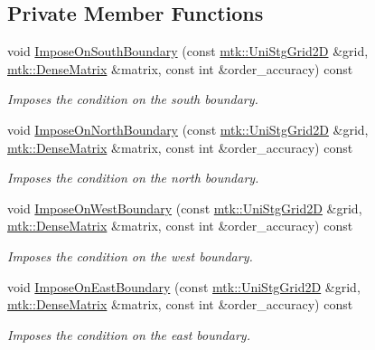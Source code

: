 \subsection*{Private Member Functions}
\begin{DoxyCompactItemize}
\item 
void \hyperlink{classmtk_1_1BCDescriptor2D_acba15639218e80fd93aff482b185201e}{Impose\+On\+South\+Boundary} (const \hyperlink{classmtk_1_1UniStgGrid2D}{mtk\+::\+Uni\+Stg\+Grid2\+D} \&grid, \hyperlink{classmtk_1_1DenseMatrix}{mtk\+::\+Dense\+Matrix} \&matrix, const int \&order\+\_\+accuracy) const 
\begin{DoxyCompactList}\small\item\em Imposes the condition on the south boundary. \end{DoxyCompactList}\item 
void \hyperlink{classmtk_1_1BCDescriptor2D_a6062894dbe7c6f42a3bbcc54f2f8973d}{Impose\+On\+North\+Boundary} (const \hyperlink{classmtk_1_1UniStgGrid2D}{mtk\+::\+Uni\+Stg\+Grid2\+D} \&grid, \hyperlink{classmtk_1_1DenseMatrix}{mtk\+::\+Dense\+Matrix} \&matrix, const int \&order\+\_\+accuracy) const 
\begin{DoxyCompactList}\small\item\em Imposes the condition on the north boundary. \end{DoxyCompactList}\item 
void \hyperlink{classmtk_1_1BCDescriptor2D_a0e7bc4d22fa8c9b9a29dd71669b35744}{Impose\+On\+West\+Boundary} (const \hyperlink{classmtk_1_1UniStgGrid2D}{mtk\+::\+Uni\+Stg\+Grid2\+D} \&grid, \hyperlink{classmtk_1_1DenseMatrix}{mtk\+::\+Dense\+Matrix} \&matrix, const int \&order\+\_\+accuracy) const 
\begin{DoxyCompactList}\small\item\em Imposes the condition on the west boundary. \end{DoxyCompactList}\item 
void \hyperlink{classmtk_1_1BCDescriptor2D_a3cf921884f08bf2eb87af6db7cc1ecba}{Impose\+On\+East\+Boundary} (const \hyperlink{classmtk_1_1UniStgGrid2D}{mtk\+::\+Uni\+Stg\+Grid2\+D} \&grid, \hyperlink{classmtk_1_1DenseMatrix}{mtk\+::\+Dense\+Matrix} \&matrix, const int \&order\+\_\+accuracy) const 
\begin{DoxyCompactList}\small\item\em Imposes the condition on the east boundary. \end{DoxyCompactList}\end{DoxyCompactItemize}
